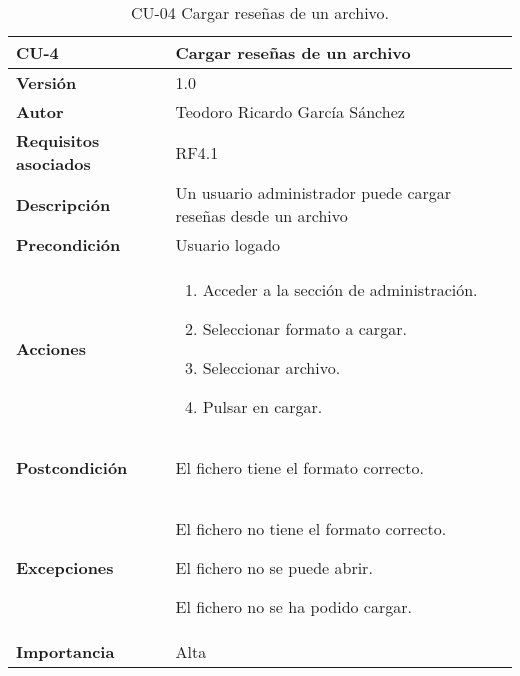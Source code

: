 \begin{table}[p]
	\centering
	\begin{tabularx}{\linewidth}{ p{} p{} }
		\toprule
		\textbf{CU-4}    & \textbf{Cargar reseñas de un archivo}\\
		\toprule
		\textbf{Versión}              & 1.0    \\
		\textbf{Autor}                & Teodoro Ricardo García Sánchez \\
		\textbf{Requisitos asociados} & RF4.1 \\
		\textbf{Descripción}          & Un usuario administrador puede cargar reseñas desde un archivo \\
		\textbf{Precondición}         & Usuario logado \\
		\textbf{Acciones}             &
		\begin{enumerate}
			\def\labelenumi{\arabic{enumi}.}
			\tightlist
			\item Acceder a la sección de administración.
			\item Seleccionar formato a cargar.
			\item Seleccionar archivo.
			\item Pulsar en cargar.
		\end{enumerate}\\
		\textbf{Postcondición}        & 
		\begin{list}
			\tightlist
			\item El fichero tiene el formato correcto.
		\end{list}\\
		\textbf{Excepciones}          & 
		\begin{list}
			\tightlist
			\item El fichero no tiene el formato correcto.
			\item El fichero no se puede abrir.
			\item El fichero no se ha podido cargar. 
		\end{list}\\
		\textbf{Importancia}          & Alta \\
		\bottomrule
	\end{tabularx}
	\caption{CU-04 Cargar reseñas de un archivo.}
\end{table}

